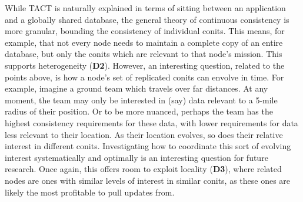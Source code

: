 While TACT is naturally explained in terms of sitting between an application and a globally shared database, the general theory of continuous consistency is more granular, bounding the consistency of individual conits. This means, for example, that not every node needs to maintain a complete copy of an entire database, but only the conits which are relevant to that node's mission. This supports heterogeneity (\textbf{D2}). However, an interesting question, related to the points above, is how a node's set of replicated conits can envolve in time. For example, imagine a ground team which travels over far distances. At any moment, the team may only be interested in (say) data relevant to a 5-mile radius of their position. Or to be more nuanced, perhaps the team has the highest consistency requirements for these data, with lower requirements for data less relevant to their location. As their location evolves, so does their relative interest in different conits. Investigating how to coordinate this sort of evolving interest systematically and optimally is an interesting question for future research. Once again, this offers room to exploit locality (\textbf{D3}), where related nodes are ones with similar levels of interest in similar conits, as these ones are likely the most profitable to pull updates from.

